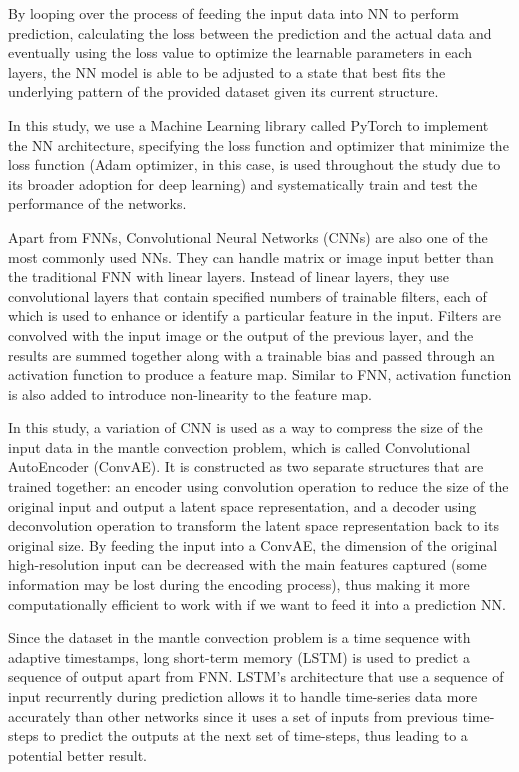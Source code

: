 By looping over the process of feeding the input data into NN to perform prediction, calculating the loss between the prediction and the actual data and eventually using the loss value to optimize the learnable parameters in each layers, the NN model is able to be adjusted to a state that best fits the underlying pattern of the provided dataset given its current structure.

In this study, we use a Machine Learning library called PyTorch to implement the NN architecture, specifying the loss function and optimizer that minimize the loss function (Adam optimizer, in this case, is used throughout the study due to its broader adoption for deep learning) and systematically train and test the performance of the networks.

Apart from FNNs, Convolutional Neural Networks (CNNs) are also one of the most commonly used NNs. They can handle matrix or image input better than the traditional FNN with linear layers. Instead of linear layers, they use convolutional layers that contain specified numbers of trainable filters, each of which is used to enhance or identify a particular feature in the input. Filters are convolved with the input image or the output of the previous layer, and the results are summed together along with a trainable bias and passed through an activation function to produce a feature map. Similar to FNN, activation function is also added to introduce non-linearity to the feature map.

In this study, a variation of CNN is used as a way to compress the size of the input data in the mantle convection problem, which is called Convolutional AutoEncoder (ConvAE). It is constructed as two separate structures that are trained together: an encoder using convolution operation to reduce the size of the original input and output a latent space representation, and a decoder using deconvolution operation to transform the latent space representation back to its original size. By feeding the input into a ConvAE, the dimension of the original high-resolution input can be decreased with the main features captured (some information may be lost during the encoding process), thus making it more computationally efficient to work with if we want to feed it into a prediction NN.

Since the dataset in the mantle convection problem is a time sequence with adaptive timestamps, long short-term memory (LSTM) is used to predict a sequence of output apart from FNN. LSTM's architecture that use a sequence of input recurrently during prediction allows it to handle time-series data more accurately than other networks since it uses a set of inputs from previous time-steps to predict the outputs at the next set of time-steps, thus leading to a potential better result.


